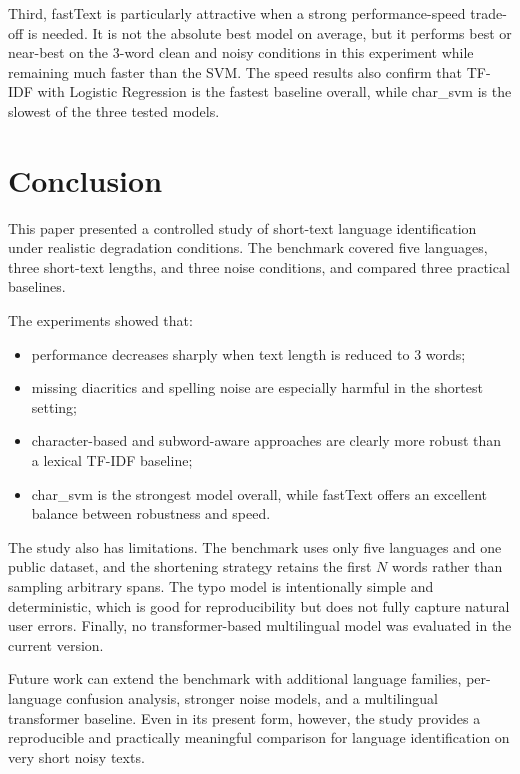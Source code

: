 \documentclass[conference]{IEEEtran}
\begin{document}
Third, fastText is particularly attractive when a strong performance-speed trade-off is needed. It is not the absolute best model on average, but it performs best or near-best on the 3-word clean and noisy conditions in this experiment while remaining much faster than the SVM. The speed results also confirm that TF-IDF with Logistic Regression is the fastest baseline overall, while char\_svm is the slowest of the three tested models.

\section{Conclusion}
\label{sec:conclusion}

This paper presented a controlled study of short-text language identification under realistic degradation conditions. The benchmark covered five languages, three short-text lengths, and three noise conditions, and compared three practical baselines.

The experiments showed that:

\begin{itemize}
    \item performance decreases sharply when text length is reduced to 3 words;
    \item missing diacritics and spelling noise are especially harmful in the shortest setting;
    \item character-based and subword-aware approaches are clearly more robust than a lexical TF-IDF baseline;
    \item char\_svm is the strongest model overall, while fastText offers an excellent balance between robustness and speed.
\end{itemize}

The study also has limitations. The benchmark uses only five languages and one public dataset, and the shortening strategy retains the first $N$ words rather than sampling arbitrary spans. The typo model is intentionally simple and deterministic, which is good for reproducibility but does not fully capture natural user errors. Finally, no transformer-based multilingual model was evaluated in the current version.

Future work can extend the benchmark with additional language families, per-language confusion analysis, stronger noise models, and a multilingual transformer baseline. Even in its present form, however, the study provides a reproducible and practically meaningful comparison for language identification on very short noisy texts.



\end{document}
